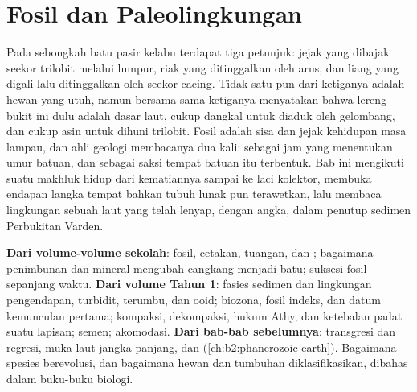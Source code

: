 \chapter{Fosil dan Paleolingkungan}\label{ch:b2:palaeoenvironments}

Pada sebongkah batu pasir kelabu terdapat tiga petunjuk: jejak yang dibajak seekor trilobit melalui lumpur,
riak yang ditinggalkan oleh arus, dan liang yang digali lalu ditinggalkan oleh seekor cacing. Tidak satu pun dari ketiganya adalah
hewan yang utuh, namun bersama-sama ketiganya menyatakan bahwa lereng bukit ini dulu adalah dasar laut, cukup dangkal
untuk diaduk oleh gelombang, dan cukup asin untuk dihuni trilobit. Fosil adalah
sisa dan jejak kehidupan masa lampau, dan ahli geologi membacanya dua kali: sebagai jam yang menentukan umur batuan,
dan sebagai saksi tempat batuan itu terbentuk. Bab ini mengikuti suatu makhluk hidup dari kematiannya
sampai ke laci kolektor, membuka endapan langka tempat bahkan tubuh lunak pun terawetkan, lalu membaca
lingkungan sebuah laut yang telah lenyap, dengan angka, dalam penutup sedimen Perbukitan Varden.

\begin{recall}
\textbf{Dari volume-volume sekolah}: fosil, cetakan, tuangan, dan ; bagaimana penimbunan dan mineral
mengubah cangkang menjadi batu; suksesi fosil sepanjang waktu. \textbf{Dari volume Tahun 1}:
fasies sedimen dan lingkungan pengendapan, turbidit, terumbu, dan ooid; biozona, fosil
indeks, dan datum kemunculan pertama; kompaksi, dekompaksi, hukum Athy, dan ketebalan padat
suatu lapisan; semen; akomodasi. \textbf{Dari bab-bab sebelumnya}: transgresi dan regresi,
muka laut jangka panjang, dan  (\cref{ch:b2:phanerozoic-earth}). Bagaimana
spesies berevolusi, dan bagaimana hewan dan tumbuhan diklasifikasikan, dibahas dalam buku-buku biologi.
\end{recall}

